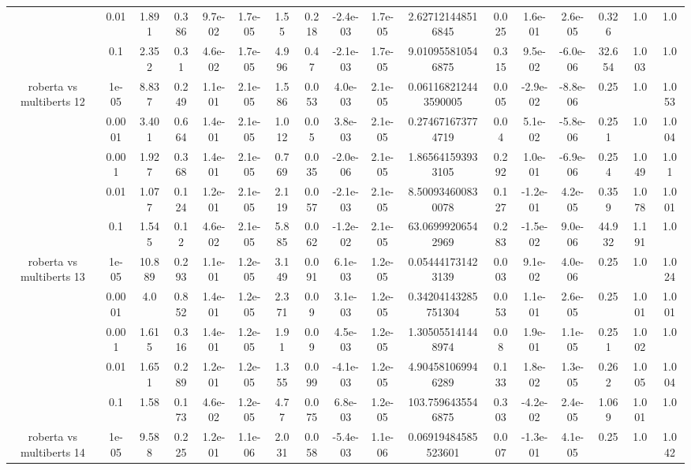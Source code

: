 \begin{tabular}{|c|c|c|c|c|c|c|c|c|c|c|c|c|c|c|c|c|}
 & 0.01 & 1.891 & 0.386 & 9.7e-02 & 1.7e-05 & 1.55 & 0.218 & -2.4e-03 & 1.7e-05 & 2.627121448516845 & 0.025 & 1.6e-01 & 2.6e-05 & 0.326 & 1.0 & 1.0 \\
 & 0.1 & 2.352 & 0.31 & 4.6e-02 & 1.7e-05 & 4.996 & 0.47 & -2.1e-03 & 1.7e-05 & 9.010955810546875 & 0.315 & 9.5e-02 & -6.0e-06 & 32.654 & 1.003 & 1.0 \\
\hline
\multirow{5}{*}{roberta  vs multiberts 12} & 1e-05 & 8.837 & 0.249 & 1.1e-01 & 2.1e-05 & 1.586 & 0.053 & 4.0e-03 & 2.1e-05 & 0.061168212443590005 & 0.005 & -2.9e-02 & -8.8e-06 & 0.25 & 1.0 & 1.053 \\
 & 0.0001 & 3.401 & 0.664 & 1.4e-01 & 2.1e-05 & 1.012 & 0.05 & 3.8e-03 & 2.1e-05 & 0.274671673774719 & 0.04 & 5.1e-02 & -5.8e-06 & 0.251 & 1.0 & 1.004 \\
 & 0.001 & 1.927 & 0.368 & 1.4e-01 & 2.1e-05 & 0.769 & 0.035 & -2.0e-06 & 2.1e-05 & 1.865641593933105 & 0.292 & 1.0e-01 & -6.9e-06 & 0.254 & 1.049 & 1.01 \\
 & 0.01 & 1.077 & 0.124 & 1.2e-01 & 2.1e-05 & 2.119 & 0.057 & -2.1e-03 & 2.1e-05 & 8.500934600830078 & 0.127 & -1.2e-01 & 4.2e-05 & 0.359 & 1.078 & 1.001 \\
 & 0.1 & 1.545 & 0.12 & 4.6e-02 & 2.1e-05 & 5.885 & 0.062 & -1.2e-02 & 2.1e-05 & 63.06999206542969 & 0.283 & -1.5e-02 & 9.0e-06 & 44.932 & 1.191 & 1.0 \\
\hline
\multirow{5}{*}{roberta  vs multiberts 13} & 1e-05 & 10.889 & 0.293 & 1.1e-01 & 1.2e-05 & 3.149 & 0.091 & 6.1e-03 & 1.2e-05 & 0.054441731423139 & 0.003 & 9.1e-02 & 4.0e-06 & 0.25 & 1.0 & 1.024 \\
 & 0.0001 & 4.0 & 0.852 & 1.4e-01 & 1.2e-05 & 2.371 & 0.09 & 3.1e-03 & 1.2e-05 & 0.34204143285751304 & 0.053 & 1.1e-01 & 2.6e-05 & 0.25 & 1.001 & 1.001 \\
 & 0.001 & 1.615 & 0.316 & 1.4e-01 & 1.2e-05 & 1.91 & 0.09 & 4.5e-03 & 1.2e-05 & 1.305055141448974 & 0.08 & 1.9e-01 & 1.1e-05 & 0.251 & 1.002 & 1.0 \\
 & 0.01 & 1.651 & 0.289 & 1.2e-01 & 1.2e-05 & 1.355 & 0.099 & -4.1e-03 & 1.2e-05 & 4.904581069946289 & 0.133 & 1.8e-02 & 1.3e-05 & 0.262 & 1.005 & 1.004 \\
 & 0.1 & 1.58 & 0.173 & 4.6e-02 & 1.2e-05 & 4.77 & 0.075 & 6.8e-03 & 1.2e-05 & 103.7596435546875 & 0.303 & -4.2e-02 & 2.4e-05 & 1.069 & 1.001 & 1.0 \\
\hline
\multirow{5}{*}{roberta  vs multiberts 14} & 1e-05 & 9.588 & 0.225 & 1.2e-01 & 1.1e-06 & 2.031 & 0.058 & -5.4e-03 & 1.1e-06 & 0.06919484585523601 & 0.007 & -1.3e-01 & 4.1e-05 & 0.25 & 1.0 & 1.042 \\

\end{tabular}
